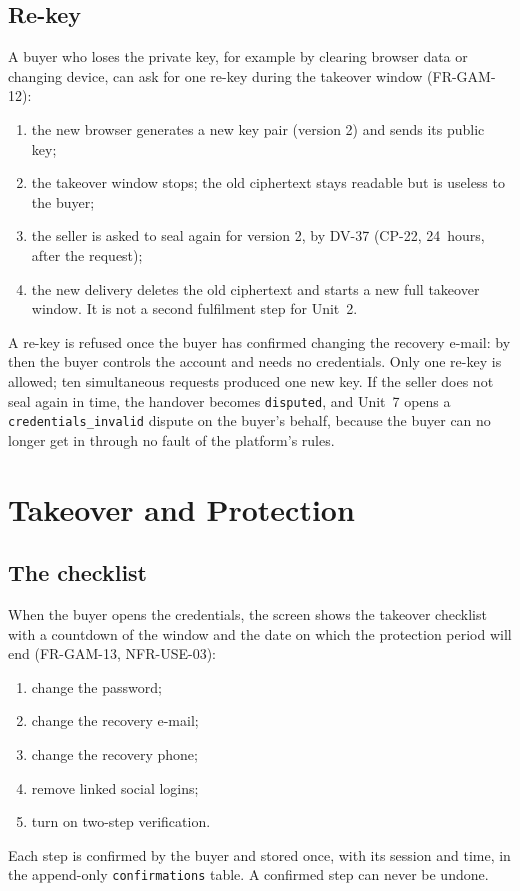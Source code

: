 \documentclass[11pt,a4paper]{article}
\begin{document}
\subsection{Re-key}
\label{sec:rekey}
A buyer who loses the private key, for example by clearing browser data or changing device, can ask for one re-key during the takeover window (FR-GAM-12):
\begin{enumerate}[nosep]
  \item the new browser generates a new key pair (version 2) and sends its public key;
  \item the takeover window stops; the old ciphertext stays readable but is useless to the buyer;
  \item the seller is asked to seal again for version 2, by DV-37 (CP-22, 24~hours, after the request);
  \item the new delivery deletes the old ciphertext and starts a new full takeover window. It is not a second fulfilment step for Unit~2.
\end{enumerate}
A re-key is refused once the buyer has confirmed changing the recovery e-mail: by then the buyer controls the account and needs no credentials. Only one re-key is allowed; ten simultaneous requests produced one new key. If the seller does not seal again in time, the handover becomes \texttt{disputed}, and Unit~7 opens a \texttt{credentials\_invalid} dispute on the buyer's behalf, because the buyer can no longer get in through no fault of the platform's rules.

\section{Takeover and Protection}
\label{sec:takeover}

\subsection{The checklist}
When the buyer opens the credentials, the screen shows the takeover checklist with a countdown of the window and the date on which the protection period will end (FR-GAM-13, NFR-USE-03):
\begin{enumerate}[nosep]
  \item change the password;
  \item change the recovery e-mail;
  \item change the recovery phone;
  \item remove linked social logins;
  \item turn on two-step verification.
\end{enumerate}
Each step is confirmed by the buyer and stored once, with its session and time, in the append-only \texttt{confirmations} table. A confirmed step can never be undone.
\end{document}
